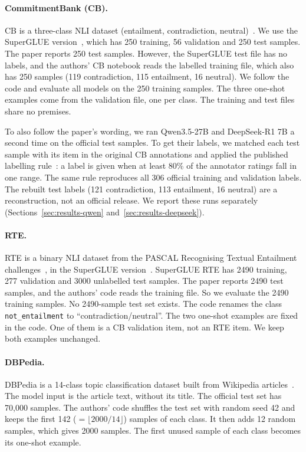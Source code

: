 \paragraph{CommitmentBank (CB).}
CB is a three-class NLI dataset (entailment, contradiction,
neutral)~\cite{deMarneffe:2019}. We use the SuperGLUE version~\cite{Wang:2019},
which has 250 training, 56 validation and 250 test samples. The paper reports
250 test samples. However, the SuperGLUE test file has no labels, and the
authors' CB notebook reads the labelled training file, which also has 250
samples (119 contradiction, 115 entailment, 16 neutral). We follow the code
and evaluate all models on the 250 training samples. The three one-shot
examples come from the validation file, one per class. The training and test
files share no premises.

To also follow the paper's wording, we ran Qwen3.5-27B and DeepSeek-R1 7B a
second time on the official test samples. To get their labels, we matched each test sample with
its item in the original CB annotations and applied the published labelling
rule~\cite{Jiang:2019}: a label is given when at least 80\% of the annotator
ratings fall in one range. The same rule reproduces all 306 official training
and validation labels. The rebuilt test labels (121 contradiction, 113
entailment, 16 neutral) are a reconstruction, not an official release. We
report these runs separately (Sections~\ref{sec:results-qwen}
and~\ref{sec:results-deepseek}).

\paragraph{RTE.}
RTE is a binary NLI dataset from the PASCAL Recognising Textual Entailment
challenges~\cite{Dagan:2006}, in the SuperGLUE version~\cite{Wang:2019}.
SuperGLUE RTE has 2490 training, 277 validation and 3000 unlabelled test
samples. The paper reports 2490 test samples, and the authors' code reads the
training file. So we evaluate the 2490 training samples. No 2490-sample test
set exists. The code renames the class \texttt{not\_entailment} to
``contradiction/neutral''. The two one-shot examples are fixed in the code. One
of them is a CB validation item, not an RTE item. We keep both examples
unchanged.

\paragraph{DBPedia.}
DBPedia is a 14-class topic classification dataset built from Wikipedia
articles~\cite{Zhang:2015}. The model input is the article text, without its
title. The official test set has 70{,}000 samples. The authors' code shuffles
the test set with random seed 42 and keeps the first 142 ($= \lfloor 2000/14
\rfloor$) samples of each class. It then adds 12 random samples, which gives
2000 samples. The first unused sample of each class becomes its one-shot
example.

